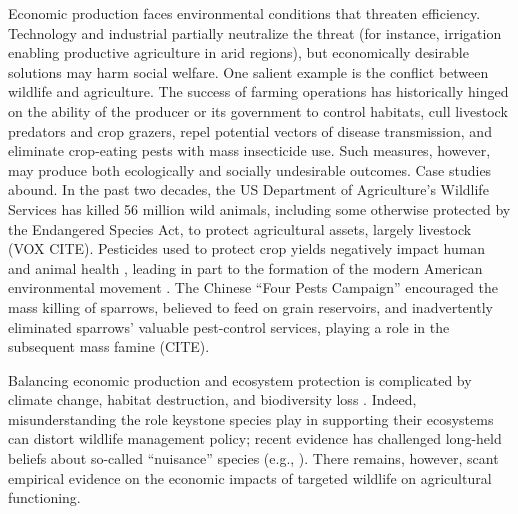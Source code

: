 

Economic production faces environmental conditions that threaten efficiency. Technology and industrial partially neutralize the threat (for instance, irrigation enabling productive agriculture in arid regions), but economically desirable solutions may harm social welfare. One salient example is the conflict between wildlife and agriculture. The success of farming operations has historically hinged on the ability of the producer or its government to control habitats, cull livestock predators and crop grazers, repel potential vectors of disease transmission, and eliminate crop-eating pests with mass insecticide use. Such measures, however, may produce both ecologically and socially undesirable outcomes. Case studies abound. In the past two decades, the US Department of Agriculture's Wildlife Services has killed 56 million wild animals, including some otherwise protected by the Endangered Species Act, to protect agricultural assets, largely livestock (VOX CITE). Pesticides used to protect crop yields negatively impact human and animal health \citep{larsen_agricultural_2017}, leading in part to the formation of the modern American environmental movement \citep{woodwell_broken_1984}. The Chinese ``Four Pests Campaign'' encouraged the mass killing of sparrows, believed to feed on grain reservoirs, and inadvertently eliminated sparrows' valuable pest-control services, playing a role in the subsequent mass famine (CITE). 

Balancing economic production and ecosystem protection is complicated by climate change, habitat destruction, and biodiversity loss \citep{cardinale_biodiversity_2012}. Indeed, misunderstanding the role keystone species play in supporting their ecosystems can distort wildlife management policy; recent evidence has challenged long-held beliefs about so-called ``nuisance'' species (e.g., \cite{raynor_wolves_2021}). There remains, however, scant empirical evidence on the economic impacts of targeted wildlife on agricultural functioning.

